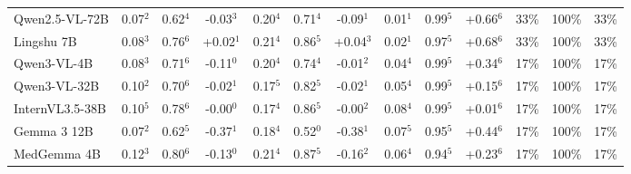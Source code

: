 \documentclass{article}
\begin{document}
\begin{table}[t]
\begin{tabular}{l@{\hspace{3pt}}ccc@{\hspace{4pt}}ccc@{\hspace{4pt}}ccc@{\hspace{4pt}}ccc}
Qwen2.5-VL-72B & \cellcolor{cfSage2}0.07$^{2}$ & \cellcolor{cfSage2}0.62$^{4}$ & \cellcolor{cfSlate2}-0.03$^{3}$ & \cellcolor{cfSage3}0.20$^{4}$ & \cellcolor{cfSage2}0.71$^{4}$ & \cellcolor{cfSlate2}-0.09$^{1}$ & \cellcolor{cfSage1}0.01$^{1}$ & \cellcolor{cfSage4}0.99$^{5}$ & \cellcolor{cfTerra4}+0.66$^{6}$ & \cellcolor{cfTerra3}33\% & \cellcolor{cfTerra4}100\% & 33\% \\
Lingshu 7B & \cellcolor{cfSage2}0.08$^{3}$ & \cellcolor{cfSage3}0.76$^{6}$ & \cellcolor{cfTerra2}+0.02$^{1}$ & \cellcolor{cfSage4}0.21$^{4}$ & \cellcolor{cfSage3}0.86$^{5}$ & \cellcolor{cfTerra2}+0.04$^{3}$ & \cellcolor{cfSage1}0.02$^{1}$ & \cellcolor{cfSage4}0.97$^{5}$ & \cellcolor{cfTerra4}+0.68$^{6}$ & \cellcolor{cfTerra3}33\% & \cellcolor{cfTerra4}100\% & 33\% \\
Qwen3-VL-4B & \cellcolor{cfSage2}0.08$^{3}$ & \cellcolor{cfSage2}0.71$^{6}$ & \cellcolor{cfSlate3}-0.11$^{0}$ & \cellcolor{cfSage4}0.20$^{4}$ & \cellcolor{cfSage2}0.74$^{4}$ & \cellcolor{cfSlate1}-0.01$^{2}$ & \cellcolor{cfSage1}0.04$^{4}$ & \cellcolor{cfSage4}0.99$^{5}$ & \cellcolor{cfTerra4}+0.34$^{6}$ & \cellcolor{cfTerra3}17\% & \cellcolor{cfTerra4}100\% & 17\% \\
Qwen3-VL-32B & \cellcolor{cfSage2}0.10$^{2}$ & \cellcolor{cfSage2}0.70$^{6}$ & \cellcolor{cfSlate2}-0.02$^{1}$ & \cellcolor{cfSage3}0.17$^{5}$ & \cellcolor{cfSage3}0.82$^{5}$ & \cellcolor{cfSlate2}-0.02$^{1}$ & \cellcolor{cfSage2}0.05$^{4}$ & \cellcolor{cfSage4}0.99$^{5}$ & \cellcolor{cfTerra3}+0.15$^{6}$ & \cellcolor{cfTerra3}17\% & \cellcolor{cfTerra4}100\% & 17\% \\
InternVL3.5-38B & \cellcolor{cfSage2}0.10$^{5}$ & \cellcolor{cfSage3}0.78$^{6}$ & \cellcolor{cfSlate1}-0.00$^{0}$ & \cellcolor{cfSage3}0.17$^{4}$ & \cellcolor{cfSage3}0.86$^{5}$ & \cellcolor{cfSlate1}-0.00$^{2}$ & \cellcolor{cfSage2}0.08$^{4}$ & \cellcolor{cfSage4}0.99$^{5}$ & \cellcolor{cfTerra1}+0.01$^{6}$ & \cellcolor{cfTerra3}17\% & \cellcolor{cfTerra4}100\% & 17\% \\
Gemma 3 12B & \cellcolor{cfSage2}0.07$^{2}$ & \cellcolor{cfSage2}0.62$^{5}$ & \cellcolor{cfSlate4}-0.37$^{1}$ & \cellcolor{cfSage3}0.18$^{4}$ & \cellcolor{cfSage1}0.52$^{0}$ & \cellcolor{cfSlate4}-0.38$^{1}$ & \cellcolor{cfSage2}0.07$^{5}$ & \cellcolor{cfSage4}0.95$^{5}$ & \cellcolor{cfTerra4}+0.44$^{6}$ & \cellcolor{cfTerra3}17\% & \cellcolor{cfTerra4}100\% & 17\% \\
MedGemma 4B & \cellcolor{cfSage3}0.12$^{3}$ & \cellcolor{cfSage3}0.80$^{6}$ & \cellcolor{cfSlate3}-0.13$^{0}$ & \cellcolor{cfSage4}0.21$^{4}$ & \cellcolor{cfSage3}0.87$^{5}$ & \cellcolor{cfSlate3}-0.16$^{2}$ & \cellcolor{cfSage2}0.06$^{4}$ & \cellcolor{cfSage4}0.94$^{5}$ & \cellcolor{cfTerra3}+0.23$^{6}$ & \cellcolor{cfTerra3}17\% & \cellcolor{cfTerra4}100\% & 17\% \\

\end{tabular}
\end{table}
\end{document}
